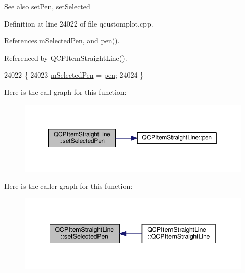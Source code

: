 \begin{DoxySeeAlso}{See also}
\hyperlink{class_q_c_p_item_straight_line_a9f36c9c9e60d7d9ac084c80380ac8601}{set\+Pen}, \hyperlink{class_q_c_p_abstract_item_a203de94ad586cc44d16c9565f49d3378}{set\+Selected} 
\end{DoxySeeAlso}


Definition at line 24022 of file qcustomplot.\+cpp.



References m\+Selected\+Pen, and pen().



Referenced by Q\+C\+P\+Item\+Straight\+Line().


\begin{DoxyCode}
24022                                                         \{
24023   \hyperlink{class_q_c_p_item_straight_line_a0307a0d56a018656adbf798bc84c2a4b}{mSelectedPen} = \hyperlink{class_q_c_p_item_straight_line_ad858ab1a444391aab778f765453ea222}{pen};
24024 \}
\end{DoxyCode}


Here is the call graph for this function\+:\nopagebreak
\begin{figure}[H]
\begin{center}
\leavevmode
\includegraphics[width=350pt]{class_q_c_p_item_straight_line_a5c33559498d33543fa95cf0a36e851ff_cgraph}
\end{center}
\end{figure}




Here is the caller graph for this function\+:\nopagebreak
\begin{figure}[H]
\begin{center}
\leavevmode
\includegraphics[width=342pt]{class_q_c_p_item_straight_line_a5c33559498d33543fa95cf0a36e851ff_icgraph}
\end{center}
\end{figure}





